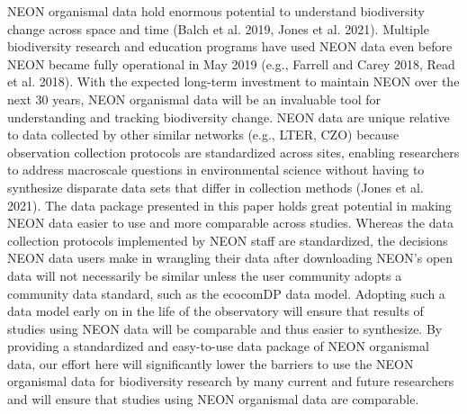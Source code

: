 \documentclass[
  12pt,
]{article}
\begin{document}
NEON organismal data hold enormous potential to understand biodiversity change across space and time (Balch et al. 2019, Jones et al. 2021). Multiple biodiversity research and education programs have used NEON data even before NEON became fully operational in May 2019 (e.g., Farrell and Carey 2018, Read et al. 2018). With the expected long-term investment to maintain NEON over the next 30 years, NEON organismal data will be an invaluable tool for understanding and tracking biodiversity change. NEON data are unique relative to data collected by other similar networks (e.g., LTER, CZO) because observation collection protocols are standardized across sites, enabling researchers to address macroscale questions in environmental science without having to synthesize disparate data sets that differ in collection methods (Jones et al. 2021). The data package presented in this paper holds great potential in making NEON data easier to use and more comparable across studies. Whereas the data collection protocols implemented by NEON staff are standardized, the decisions NEON data users make in wrangling their data after downloading NEON's open data will not necessarily be similar unless the user community adopts a community data standard, such as the ecocomDP data model. Adopting such a data model early on in the life of the observatory will ensure that results of studies using NEON data will be comparable and thus easier to synthesize. By providing a standardized and easy-to-use data package of NEON organismal data, our effort here will significantly lower the barriers to use the NEON organismal data for biodiversity research by many current and future researchers and will ensure that studies using NEON organismal data are comparable.
\end{document}
